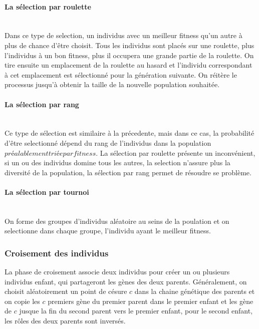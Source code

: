 \documentclass{article}
\begin{document}
        \paragraph{La sélection par roulette}\mbox{}\\
        Dans ce type de selection, un individus avec un meilleur fitness qu'un autre à plus de chance d'être choisit. Tous les individus sont placés sur une roulette, plus l'individus à un bon fitness, plus il occupera une grande partie de la roulette. On tire ensuite un emplacement de la roulette au hasard et l'individu correspondant à cet emplacement est sélectionné pour la génération suivante. On réitère le processus jusqu'à obtenir la taille de la nouvelle population souhaitée.

        \paragraph{La sélection par rang}\mbox{}\\
        Ce type de sélection est similaire à la précedente, mais dans ce cas, la probabilité d'être selectionné dépend du rang de l'individus dans la population \(préalablement triée par fitness\). La sélection par roulette présente un inconvénient, si un ou des individus domine tous les autres, la selection n'assure plus la diversité de la population, la sélection par rang permet de résoudre se problème.

        \paragraph{La sélection par tournoi}\mbox{}\\
        On forme des groupes d'individus aléatoire au seins de la poulation et on selectionne dans chaque groupe, l'individu ayant le meilleur fitness.

        \subsubsection{Croisement des individus}
        La phase de croisement associe deux individus pour créer un ou plusieurs individus enfant, qui partageront les gènes des deux parents. Généralement, on choisit aléatoirement un point de césure $c$ dans la chaine génétique des parents et on copie les $c$ premiers gène du premier parent dans le premier enfant et les gène de $c$ jusque la fin du second parent vers le premier enfant, pour le second enfant, les rôles des deux parents sont inversés.
\end{document}
